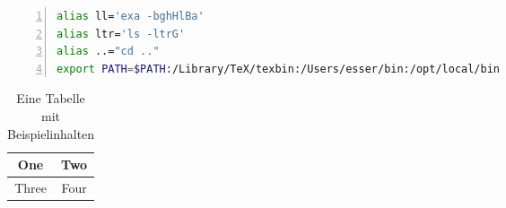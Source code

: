 \documentclass[twoside,a4paper]{IEEEtran}
\begin{document}
\Blindtext[1]


\begin{lstlisting}[language=Bash,float={t!},label=listing1,caption={Das ist das zweite Listing (float.sh).},numbers=left,xleftmargin=6mm]
alias ll='exa -bghHlBa'
alias ltr='ls -ltrG'
alias ..="cd .."
export PATH=$PATH:/Library/TeX/texbin:/Users/esser/bin:/opt/local/bin
\end{lstlisting}


\begin{table}[t]
  \caption{Eine Tabelle mit Beispielinhalten}
  \label{table_example}
  \centering
  \begin{tabular}{|c||c|}
    \hline
    One & Two\\
    \hline
    Three & Four\\
    \hline
  \end{tabular}
\end{table}






%
%
\end{document}
